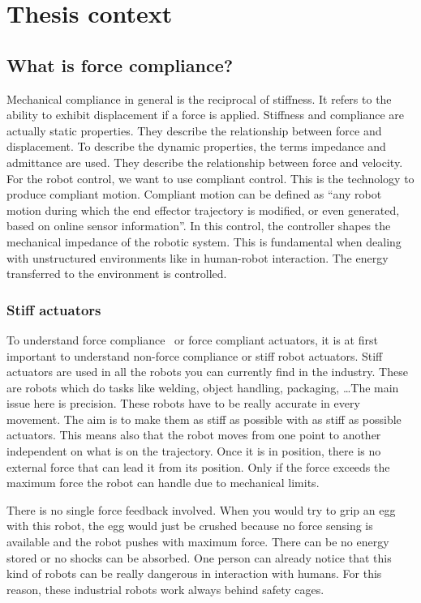 \documentclass[11pt,a4paper]{report}
\begin{document}
\chapter{Thesis context}
\section{What is force compliance?}
Mechanical compliance in general is the reciprocal of stiffness. It refers to the ability to exhibit displacement if a force is applied. Stiffness and compliance are actually static properties. They describe the relationship between force and displacement. To describe the dynamic properties, the terms impedance and admittance are used. They describe the relationship between force and velocity. 
For the robot control, we want to use compliant control. This is the technology to produce compliant motion. Compliant motion can be defined as ``any robot motion during which the end effector trajectory is modified, or even generated, based on online sensor information''. In this control, the controller shapes the mechanical impedance of the robotic system. This is fundamental when dealing with unstructured environments like in human-robot interaction. The energy transferred to the environment is controlled.~\cite{CompliantControl}

\subsection{Stiff actuators}
To understand force compliance~\cite{CompliantRobot} or force compliant actuators, it is at first important to understand non-force compliance or stiff robot actuators.
Stiff actuators are used in all the robots you can currently find in the industry. These are robots which do tasks like welding, object handling, packaging, \ldots The main issue here is precision. These robots have to be really accurate in every movement. The aim is to make them as stiff as possible with as stiff as possible actuators. This means also that the robot moves from one point to another independent on what is on the trajectory. Once it is in position, there is no external force that can lead it from its position. Only if the force exceeds the maximum force the robot can handle due to mechanical limits.

There is no single force feedback involved. When you would try to grip an egg with this robot, the egg would just be crushed because no force sensing is available and the robot pushes with maximum force. There can be no energy stored or no shocks can be absorbed. One person can already notice that this kind of robots can be really dangerous in interaction with humans. For this reason, these industrial robots work always behind safety cages.
\end{document}
